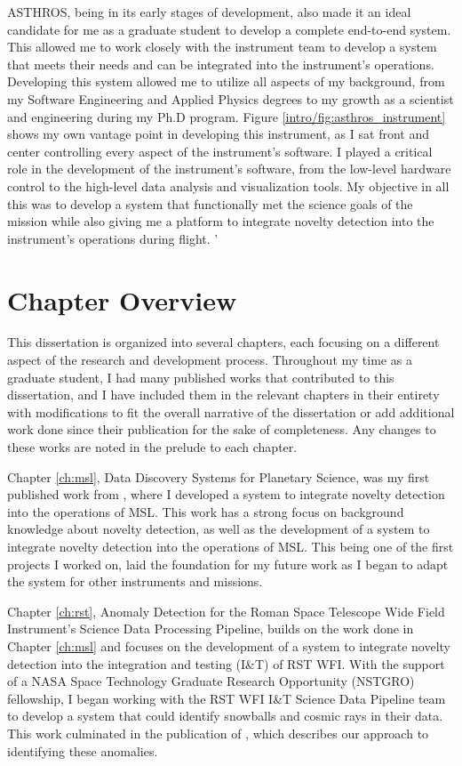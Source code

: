 ASTHROS, being in its early stages of development, also made it an ideal candidate for me as a graduate student to develop a complete end-to-end system.
This allowed me to work closely with the instrument team to develop a system that meets their needs and can be integrated into the instrument's operations.
Developing this system allowed me to utilize all aspects of my background, from my Software Engineering and Applied Physics degrees to my growth as a scientist and engineering during my Ph.D program.
Figure \ref{intro/fig:asthros_instrument} shows my own vantage point in developing this instrument, as I sat front and center controlling every aspect of the instrument's software. 
I played a critical role in the development of the instrument's software, from the low-level hardware control to the high-level data analysis and visualization tools.
My objective in all this was to develop a system that functionally met the science goals of the mission while also giving me a platform to integrate novelty detection into the instrument's operations during flight. '

\section{Chapter Overview}
This dissertation is organized into several chapters, each focusing on a different aspect of the research and development process.
Throughout my time as a graduate student, I had many published works that contributed to this dissertation, and I have included them in the relevant chapters in their entirety with modifications to fit the overall narrative of the dissertation or add additional work done since their publication for the sake of completeness.
Any changes to these works are noted in the prelude to each chapter.

Chapter \ref{ch:msl}, Data Discovery Systems for Planetary Science,  was my first published work from \cite{horton2021integrating}, where I developed a system to integrate novelty detection into the operations of MSL.
This work has a strong focus on background knowledge about novelty detection, as well as the development of a system to integrate novelty detection into the operations of MSL.
This being one of the first projects I worked on, laid the foundation for my future work as I began to adapt the system for other instruments and missions.

Chapter \ref{ch:rst}, Anomaly Detection for the Roman Space Telescope Wide Field Instrument's Science Data Processing Pipeline, builds on the work done in Chapter \ref{ch:msl} and focuses on the development of a system to integrate novelty detection into the integration and testing (I\&T) of RST WFI.
With the support of a NASA Space Technology Graduate Research Opportunity (NSTGRO) fellowship, I began working with the RST WFI I\&T Science Data Pipeline team to develop a system that could identify snowballs and cosmic rays in their data. 
This work culminated in the publication of \cite{horton2024anomaly}, which describes our approach to identifying these anomalies. 

